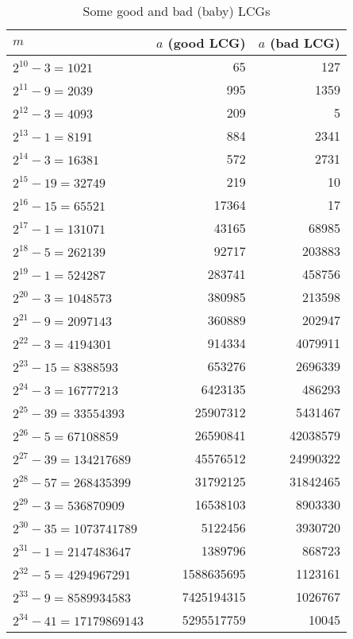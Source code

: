 \begin {table}
\begin {center}
\caption {Some good and bad (baby) LCGs}
\label {tab:lcg1t}
\smallskip 
\begin {tabular}{|lrr|}
\hline
\qquad $m$             & $a$ (good LCG)  & $a$ (bad LCG)  \\
\hline
 $2^{10}-3  = 1021$    &  65             & 127  \\
 $2^{11}-9  = 2039$    & 995             & 1359 \\
 $2^{12}-3 = 4093$    & 209             & 5  \\
 $2^{13}-1 = 8191$    & 884             & 2341 \\
 $2^{14}-3 = 16381$   & 572             & 2731 \\
 $2^{15}-19 = 32749$  & 219             & 10 \\
 $2^{16}-15 = 65521$  & 17364           & 17 \\
 $2^{17}-1 = 131071$  & 43165           & 68985 \\
 $2^{18}-5 = 262139$  & 92717           & 203883 \\
 $2^{19}-1 = 524287$  & 283741          & 458756 \\
 $2^{20}-3 = 1048573$ & 380985          & 213598 \\
 $2^{21}-9 = 2097143$  & 360889          & 202947 \\
 $2^{22}-3 = 4194301$  & 914334          & 4079911 \\
 $2^{23}-15 = 8388593$  & 653276         & 2696339 \\
 $2^{24}-3 = 16777213$  & 6423135        & 486293 \\
 $2^{25}-39 = 33554393$  & 25907312      & 5431467 \\
 $2^{26}-5 = 67108859$  & 26590841       & 42038579 \\
 $2^{27}-39 = 134217689$  & 45576512     & 24990322 \\
 $2^{28}-57 = 268435399$  & 31792125     & 31842465 \\
 $2^{29}-3 = 536870909$   & 16538103     & 8903330 \\
 $2^{30}-35 = 1073741789$  & 5122456     & 3930720 \\
 $2^{31}-1 = 2147483647$  &  1389796     & 868723 \\
 $2^{32} -5 = 4294967291$ & 1588635695   & 1123161 \\
 $2^{33}-9 = 8589934583 $ & 7425194315   & 1026767 \\
 $2^{34}-41 = 17179869143$ & 5295517759  & 10045 \\

\end{tabular}
\end{center}
\end{table}
